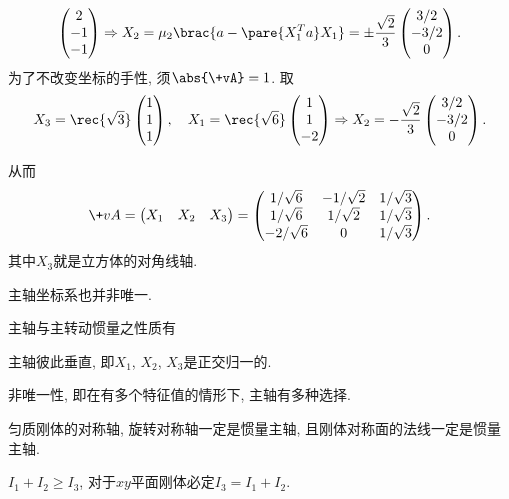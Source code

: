 \documentclass[../LectureNotes.tex]{subfiles}
\begin{document}
\begin{sample}
\begin{ex}
\begin{cenum}
\begin{align*}
\begin{pmatrix}
                    2 \\ -1 \\ -1
                \end{pmatrix} \Rightarrow X_2 = \mu_2 \brac{a - \pare{X_1^T a}X_1} = \pm \frac{\sqrt{2}}{3} \begin{pmatrix}
                    3/2 \\ -3/2 \\ 0
                \end{pmatrix}.
            \end{align*}
            为了不改变坐标的手性, 须$\abs{\+vA} = 1$. 取
            \[ X_3 = \rec{\sqrt{3}}\begin{pmatrix}
                1 \\ 1 \\ 1
            \end{pmatrix},\quad X_1 = \rec{\sqrt{6}}\begin{pmatrix}
                1 \\ 1 \\ -2
            \end{pmatrix}  \Rightarrow  X_2 = -\frac{\sqrt{2}}{3}\begin{pmatrix}
                3/2 \\ -3/2 \\ 0
            \end{pmatrix}. \]
        \end{cenum}
        从而\let\oldrec\rec\def\rec{1/}
            \[ \+vA = \begin{pmatrix}
                X_1 & X_2 & X_3
            \end{pmatrix} = \begin{pmatrix}
                \rec{\sqrt{6}} & -\rec{\sqrt{2}} & \rec{\sqrt{3}} \\
                \rec{\sqrt{6}} & \rec{\sqrt{2}} & \rec{\sqrt{3}} \\
                -2/{\sqrt{6}}   & 0 & \rec{\sqrt{3}}
            \end{pmatrix}. \]
        \let\rec\oldrec
        其中$X_3$就是立方体的对角线轴.
    \end{ex}
\end{sample}
\begin{remark}
    主轴坐标系也并非唯一.
\end{remark}
主轴与主转动惯量之性质有
\begin{cenum}
    \item 主轴彼此垂直, 即$X_1$, $X_2$, $X_3$是正交归一的.
    \item 非唯一性, 即在有多个特征值的情形下, 主轴有多种选择.
    \item 匀质刚体的对称轴, 旋转对称轴一定是惯量主轴, 且刚体对称面的法线一定是惯量主轴.
    \item $I_1 + I_2 \ge I_3$, 对于$xy$平面刚体必定$I_3 = I_1 + I_2$.
\end{cenum}
\end{document}
